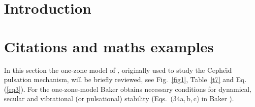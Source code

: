 \documentclass{aa}
\begin{document}
\section{Introduction}
\lipsum[1]
\section{Citations and maths examples}

   In this section the one-zone model of \citet{baker},
   originally used to study the Cephe{\"{\i}}d pulsation mechanism, will
   be briefly reviewed, see Fig.~\ref{fig1}, Table~\ref{t7} and Eq. (\ref{eq3}).
   For the one-zone-model Baker obtains necessary conditions
   for dynamical, secular and vibrational (or pulsational)
   stability (Eqs.\ (34a,\,b,\,c) in Baker \citeyear{baker}).
   
\end{document}
